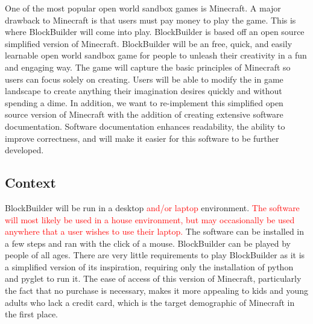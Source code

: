 \documentclass{article}
\begin{document}
One of the most popular open world sandbox games is Minecraft. A major drawback to Minecraft is that users must pay money to play the game. This is where BlockBuilder will come into play. BlockBuilder is based off an open source simplified version of Minecraft. BlockBuilder will be an free, quick, and easily learnable open world sandbox game for people to unleash their creativity in a fun and engaging way. The game will capture the basic principles of Minecraft so users can focus solely on creating. Users will be able to modify the in game landscape to create anything their imagination desires quickly and without spending a dime. In addition, we want to re-implement this simplified open source version of Minecraft with the addition of creating extensive software documentation. Software documentation enhances readability, the ability to improve correctness, and will make it easier for this software to be further developed.

\subsection*{Context}
BlockBuilder will be run in a desktop \textcolor{red}{and/or laptop }environment. \textcolor{red}{The software will most likely be used in a house environment, but may occasionally be used anywhere that a user wishes to use their laptop. }The software can be installed in a few steps and ran with the click of a mouse. BlockBuilder can be played by people of all ages. There are very little requirements to play BlockBuilder as it is a simplified version of its inspiration, requiring only the installation of python and pyglet to run it. The ease of access of this version of Minecraft, particularly the fact that no purchase is necessary, makes it more appealing to kids and young adults who lack a credit card, which is the target demographic of Minecraft in the first place.




\end{document}
